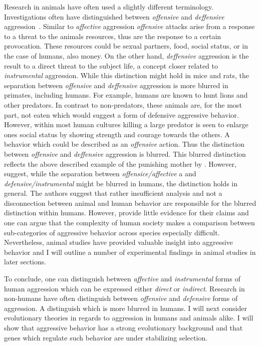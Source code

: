 \documentclass[../header.tex]{subfiles}
\begin{document}
Research in animals have often used a slightly different terminology.
Investigations often have distinguished between \textit{offensive} and \textit{deffensive} aggression~\cite{Blanchard2005b}.
Similar to \textit{affective} aggression \textit{offensive} attacks arise from a response to a threat to the animals resources, thus are the response to a certain provocation.
These resources could be sexual partners, food, social status, or in the case of humans, also money.
On the other hand, \textit{deffensive} aggression is the result to a direct threat to the subject life, a concept closer related to \textit{instrumental} aggression.
While this distinction might hold in mice and rats, the separation between \textit{offensive} and \textit{deffensive} aggression is more blurred in primates, including humans.
For example, humans are known to hunt lions and other predators.
In contrast to non-predators, these animals are, for the most part, not eaten which would suggest a form of defensive aggressive behavior.
However, within most human cultures killing a large predator is seen to enlarge ones social status by showing strength and courage towards the others.
A behavior which could be described as an \textit{offensive} action.
Thus the distinction between \textit{offensive} and \textit{deffensive} aggression is blurred.
This blurred distinction reflects the above described example of the punishing mother by \citet{Geen2001}.
However, \citet{Blanchard2005b} suggest, while the separation between \textit{offensice/affective} a and \textit{defensive/instrumental} might be blurred in humans, the distinction holds in general.
The authors suggest that rather insufficient analysis and not a disconnection between animal and human behavior are responsible for the blurred distinction within humans.
However, \citet{Blanchard2005b} provide little evidence for their claims and one can argue that the complexity of human society makes a comparison between sub-categories of aggressive behavior across species especially difficult. 
Nevertheless, animal studies have provided valuable insight into aggressive behavior and I will outline a number of experimental findings in animal studies in later sections.

To conclude, one can distinguish between \textit{affective} and \textit{instrumental} forms of human aggression which can be expressed either \textit{direct} or \textit{indirect}.
Research in non-humans have often distinguish between \textit{offensive} and \textit{defensive} forms of aggression.
A distinguish which is more blurred in humans.
I will next consider evolutionary theories in regards to aggression in humans and animals alike.
I will show that aggressive behavior has a strong evolutionary background and that genes which regulate such behavior are under stabilizing selection.
\end{document}

